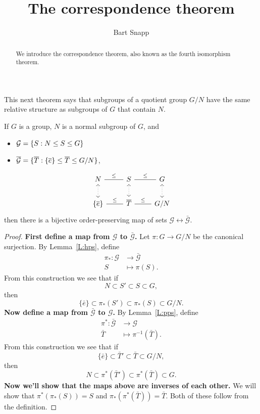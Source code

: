 \documentclass{ximera}
\author{Bart Snapp}
\title{The correspondence theorem}
\begin{document}
\begin{abstract}
  We introduce the correspondence theorem, also known as the fourth
  isomorphism theorem.
\end{abstract}
\maketitle

This next theorem says that subgroups of a quotient group $G/N$ have
the same relative structure as subgroups of $G$ that contain $N$.

\begin{theorem}
  If $G$ is a group, $N$ is a normal subgroup of $G$, and
  \begin{itemize}
  \item $\mathcal{G} = \{S:N\leq S\leq G\}$
  \item $\mathcal{\overline{G}} = \{\overline{T}:\{\overline{e}\}\leq \overline{T}\leq G/N\}$,
  \end{itemize}
  \[
  \begin{tikzcd}
    N \ar[r,-,"\subgp"] \ar[d,<->,dotted]& S\ar[r,-,"\subgp"] \ar[d,<->,dotted]& G \ar[d,<->,dotted]\\
    \{\bar{e}\} \ar[r,-,"\subgp"] & \bar{T} \ar[r,-,"\subgp"] & G/N
  \end{tikzcd}
  \]
  then there is a bijective order-preserving map of sets
  $\mathcal{G}\leftrightarrow\mathcal{\bar{G}}$.
  \begin{proof}
    \textbf{First define a map from $\pmb{\mathcal{G}}$ to
      $\pmb{\mathcal{\bar{G}}}$.} Let $\pi:G\to G/N$ be the canonical
    surjection.  By Lemma~\ref{L:hps}, define
    \begin{align*}
    \pi_*:\mathcal{G} &\to \bar{\mathcal{G}}\\
    S &\mapsto \pi(S).
    \end{align*}
    From this construction we see that if
    \[
    N \subset S'\subset S \subset G,
    \]
    then
    \[
    \{\bar{e}\}\subset \pi_*(S') \subset \pi_*(S)\subset G/N.
    \]
    \textbf{Now define a map from $\pmb{\mathcal{\bar{G}}}$ to
      $\pmb{\mathcal{G}}$.}
    By Lemma~\ref{L:pps}, define
    \begin{align*}
      \pi^*:\bar{\mathcal{G}} &\to \mathcal G\\ \bar{T} &\mapsto
      \pi^{-1}(\bar{T}).
    \end{align*}
    From this construction we see that if
    \[
    \{\bar{e}\} \subset \bar{T}\hspace{0em}' \subset \bar{T} \subset G/N,
    \]
    then
    \[
    N \subset \pi^*(\bar{T}\hspace{0em}')\subset \pi^*(\bar{T}) \subset G.
    \]
    \textbf{Now we'll show that the maps above are inverses of each
      other.} We will show that $\pi^*(\pi_*(S)) = S$ and
    $\pi_*(\pi^*(\bar T)) = \bar{T}$. Both of these follow from the
    definition.


\end{proof}
\end{theorem}
\end{document}
